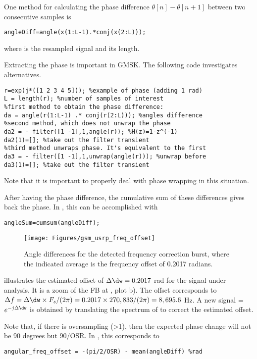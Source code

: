 One method for calculating the phase difference $\theta[n]-\theta[n+1]$ between two consecutive samples is
\begin{lstlisting}
angleDiff=angle(x(1:L-1).*conj(x(2:L)));
\end{lstlisting}
where  is the resampled signal and  its length. 

Extracting the phase is important in GMSK. The following code investigates alternatives.
\begin{lstlisting}
r=exp(j*([1 2 3 4 5])); %example of phase (adding 1 rad)
L = length(r); %number of samples of interest
%first method to obtain the phase difference:
da = angle(r(1:L-1) .* conj(r(2:L))); %angles difference
%second method, which does not unwrap the phase
da2 = - filter([1 -1],1,angle(r)); %H(z)=1-z^(-1)
da2(1)=[]; %take out the filter transient
%third method unwraps phase. It's equivalent to the first
da3 = - filter([1 -1],1,unwrap(angle(r))); %unwrap before
da3(1)=[]; %take out the filter transient
\end{lstlisting}
Note that it is important to properly deal with phase wrapping in this situation.

After having the phase difference, the cumulative sum of these differences gives back the phase. In {\matlab}, this can be accomplished with
\begin{lstlisting}
angleSum=cumsum(angleDiff);
\end{lstlisting}

\begin{figure}
\centering
\texttt{[image: Figures/gsm\_usrp\_freq\_offset]}
\caption{Angle differences for the detected frequency correction burst, where the indicated average is the frequency offset of 0.2017 radians.\label{fig:gsm_usrp_freq_offset}}
\end{figure}

 illustrates the estimated offset of $\Delta \dw = 0.2017$ rad for the signal under analysis. It is a zoom of the FB at , plot b). The offset corresponds to $\Delta f = \Delta \dw \times F_s / (2 \pi) = 0.2017 \times 270,833 / (2 \pi) = 8,695.6$ Hz. A new signal  =   $e^{-j \Delta \dw}$ is obtained by translating the spectrum of  to correct the estimated offset.

Note that, if there is oversampling (>1), then the expected phase change will not be 90 degrees but 90/OSR. In {\matlab}, this corresponds to
\begin{lstlisting}
angular_freq_offset = -(pi/2/OSR) - mean(angleDiff) %rad
\end{lstlisting}

